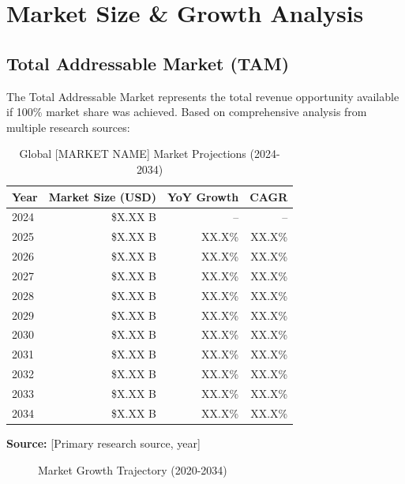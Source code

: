 \documentclass[11pt,letterpaper]{report}
\newcommand{\reporttitle}{[MARKET NAME]}
\begin{document}
\chapter{Market Size \& Growth Analysis}

\section{Total Addressable Market (TAM)}

The Total Addressable Market represents the total revenue opportunity available if 100\% market share was achieved. Based on comprehensive analysis from multiple research sources:


\begin{table}[htbp]
\centering
\caption{Global \reporttitle{} Market Projections (2024-2034)}
\begin{tabular}{@{}lrrr@{}}
\toprule
\textbf{Year} & \textbf{Market Size (USD)} & \textbf{YoY Growth} & \textbf{CAGR} \\
\midrule
2024 & \$X.XX B & -- & -- \\
\rowcolor{tablealt} 2025 & \$X.XX B & XX.X\% & XX.X\% \\
2026 & \$X.XX B & XX.X\% & XX.X\% \\
\rowcolor{tablealt} 2027 & \$X.XX B & XX.X\% & XX.X\% \\
2028 & \$X.XX B & XX.X\% & XX.X\% \\
\rowcolor{tablealt} 2029 & \$X.XX B & XX.X\% & XX.X\% \\
2030 & \$X.XX B & XX.X\% & XX.X\% \\
\rowcolor{tablealt} 2031 & \$X.XX B & XX.X\% & XX.X\% \\
2032 & \$X.XX B & XX.X\% & XX.X\% \\
\rowcolor{tablealt} 2033 & \$X.XX B & XX.X\% & XX.X\% \\
2034 & \$X.XX B & XX.X\% & XX.X\% \\
\bottomrule
\end{tabular}
\label{tab:tam_projections}
\end{table}

\textbf{Source:} [Primary research source, year]

\begin{figure}[htbp]
\centering
\caption{Market Growth Trajectory (2020-2034)}
\label{fig:market_growth}
\end{figure}
\end{document}
